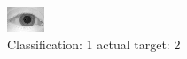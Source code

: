 \begin{figure}[h!]
\begin{center}
\includegraphics[width=0.60\columnwidth]{figures/ID959_class_1_target_2.png}
\end{center}
\caption{ Classification: 1 actual target: 2}
\label{fig:ID959_class_1_target_2}
\end{figure}
